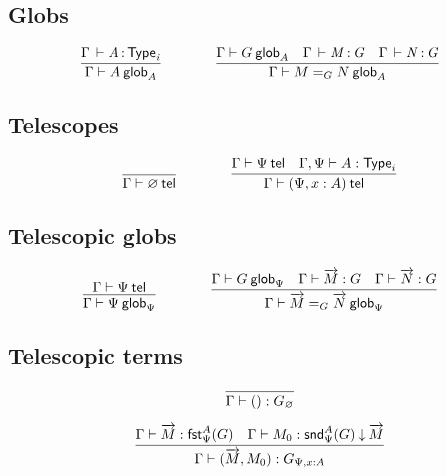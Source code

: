 
\subsection{Globs}

\begin{small}
  \[
  \infer{\wfglob{\Gamma}{A}{A}}
  {\oftp{\Gamma}{A}{\typ{i}}}
  \qquad\qquad
  \infer{\wfglob{\Gamma}{\homj{G}{M}{N}}{A}}
  {\wfglob{\Gamma}{G}{A} &
    \oftp{\Gamma}{M}{G} &
    \oftp{\Gamma}{N}{G}
  }
  \]
\end{small}

\subsection{Telescopes}

\begin{small}
  \[
  \infer{\wftel{\Gamma}{\varnothing}}{}
  \qquad\qquad
  \infer{\wftel{\Gamma}{(\Psi,x:A)}}
  {\wftel{\Gamma}{\Psi}
    & \wftype{\Gamma,\Psi}{A}}
  \]
\end{small}

\subsection{Telescopic globs}

\begin{small}
  \[
  \infer{\wfglob{\Gamma}{\Psi}{\Psi}}
  {\wftel{\Gamma}{\Psi}}
  \qquad\qquad
  \infer{\wfglob{\Gamma}{\homj{G}{\tel{M}}{\tel{N}}}{\Psi}}
  {\wfglob{\Gamma}{G}{\Psi}
    & \ofglob{\Gamma}{\tel{M}}{G}
    & \ofglob{\Gamma}{\tel{N}}{G}}
  \]
\end{small}

\subsection{Telescopic terms}

\begin{small}
  \[
  \infer{\ofglob{\Gamma}{()}{G_\varnothing}}{}
  \]

  \[
  \infer{\ofglob{\Gamma}{(\tel{M},M_0)}{G_{\Psi,x:A}}}
  {\ofglob{\Gamma}{\tel M}{\fsttelglob{\Psi}{A}{G}}
    & \ofdepglob{\Gamma}{M_0}{\sndtelglob{\Psi}{A}{G}}{\tel M}}
  \]
\end{small}

